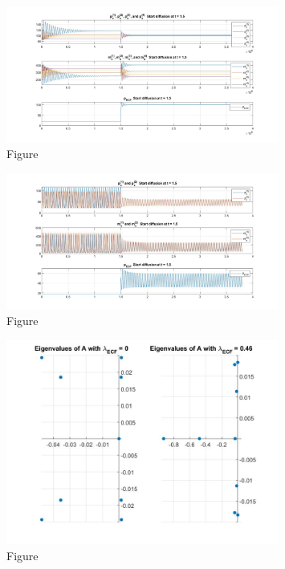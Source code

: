 \documentclass[12pt]{article}
\renewcommand{\(}{\left (}
\renewcommand{\)}{\right )}
\begin{document}
\begin{figure}[ht]
    \centering
	\begin{minipage}{0.99\textwidth}
		\centering
		\includegraphics[width=0.8\textwidth]{SS_M.jpg}
		\caption*{\small Figure}
	\end{minipage}
\end{figure}


\begin{figure}[ht]
    \centering
	\begin{minipage}{0.99\textwidth}
		\centering
		\includegraphics[width=0.8\textwidth]{UU.jpg}
		\caption*{\small Figure}
	\end{minipage}
\end{figure}

\begin{figure}[ht]
    \centering
	\begin{minipage}{0.99\textwidth}
		\centering
		\includegraphics[width=0.8\textwidth]{UUEi.jpg}
		\caption*{\small Figure}
	\end{minipage}
\end{figure}
\end{document}
